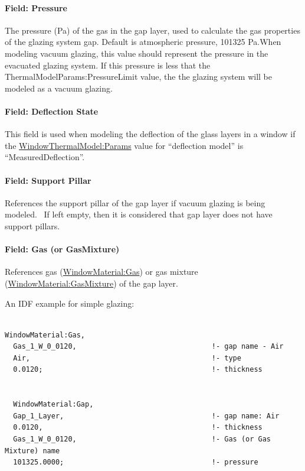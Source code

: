 \paragraph{Field: Pressure}\label{field-pressure-000}

The pressure (Pa) of the gas in the gap layer, used to calculate the gas properties of the glazing system gap. Default is atmospheric pressure, 101325 Pa.When modeling vacuum glazing, this value should represent the pressure in the evacuated glazing system. If this pressure is less that the ThermalModelParams:PressureLimit value, the the glazing system will be modeled as a vacuum glazing.

\paragraph{Field: Deflection State}\label{field-deflection-state}

This field is used when modeling the deflection of the glass layers in a window if the \hyperref[windowthermalmodelparams]{WindowThermalModel:Params} value for ``deflection model'' is ``MeasuredDeflection''.

\paragraph{Field: Support Pillar}\label{field-support-pillar}

References the support pillar of the gap layer if vacuum glazing is being modeled.~ If left empty, then it is considered that gap layer does not have support pillars.

\paragraph{Field: Gas (or GasMixture)}\label{field-gas-or-gasmixture}

References gas (\hyperref[windowmaterialgas]{WindowMaterial:Gas}) or gas mixture (\hyperref[windowmaterialgasmixture]{WindowMaterial:GasMixture}) of the gap layer.

An IDF example for simple glazing:

\begin{lstlisting}

WindowMaterial:Gas,
  Gas_1_W_0_0120,                                !- gap name - Air
  Air,                                           !- type
  0.0120;                                        !- thickness


  WindowMaterial:Gap,
  Gap_1_Layer,                                   !- gap name: Air
  0.0120,                                        !- thickness
  Gas_1_W_0_0120,                                !- Gas (or Gas Mixture) name
  101325.0000;                                   !- pressure
\end{lstlisting}

